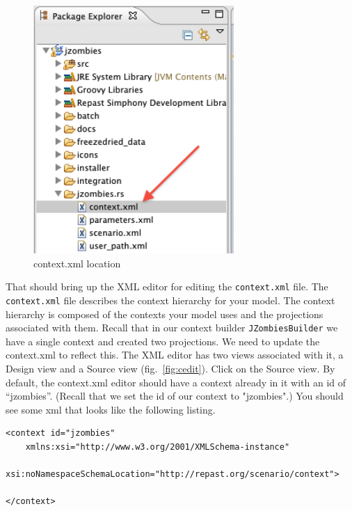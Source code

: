 \documentclass[11pt]{amsart}
\begin{document}
\begin{figure}[h]
\begin{center}
\vspace{.2in}
\centerline {
\includegraphics[width=3in]{GettingStartedImages/context_xml.png}
}
\caption{context.xml location}
\label{fig:context}
\end{center}
\end{figure}

That should bring up the XML editor for editing the \texttt{context.xml} file. The \texttt{context.xml} file describes the context hierarchy for your model. The context hierarchy is composed of the contexts your model uses and the projections associated with them. Recall that in our context builder \texttt{JZombiesBuilder} we have a single context and created two projections. We need to update the context.xml to reflect this. The XML editor has two views associated with it, a Design view and a Source view (fig.~\ref{fig:cedit}). Click on the Source view. By default, the context.xml editor should have a context already in it with an id of ``jzombies''. (Recall that we set the id of our context to "jzombies".) You should see some xml that looks like the following listing.

\noindent\begin{minipage}[h]{\textwidth}
\vspace{.2in}
\lstset{language=java,caption=JZombiesBuilder.build Complete }
\begin{lstlisting}
<context id="jzombies"
	xmlns:xsi="http://www.w3.org/2001/XMLSchema-instance"
	xsi:noNamespaceSchemaLocation="http://repast.org/scenario/context">
	
</context>

\end{lstlisting}
\vspace{.2in}
\end{minipage}
\end{document}
